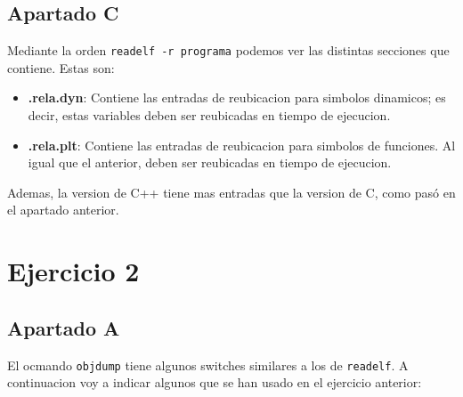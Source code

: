 \documentclass{article}
\begin{document}
\newpage

\subsection*{Apartado C}

Mediante la orden \verb|readelf -r programa| podemos ver las distintas secciones que contiene. Estas son:

\begin{itemize}
    \item \textbf{.rela.dyn}: Contiene las entradas de reubicacion para simbolos dinamicos; es decir, estas variables deben ser reubicadas en tiempo de ejecucion.
    \item \textbf{.rela.plt}: Contiene las entradas de reubicacion para simbolos de funciones. Al igual que el anterior, deben ser reubicadas en tiempo de ejecucion.
\end{itemize}

Ademas, la version de C++ tiene mas entradas que la version de C, como pasó en el apartado anterior.

\bigskip

\section*{Ejercicio 2}


\subsection*{Apartado A}

El ocmando \verb|objdump| tiene algunos switches similares a los de \verb|readelf|. A continuacion voy a indicar algunos que se han usado en el ejercicio anterior:
\end{document}
